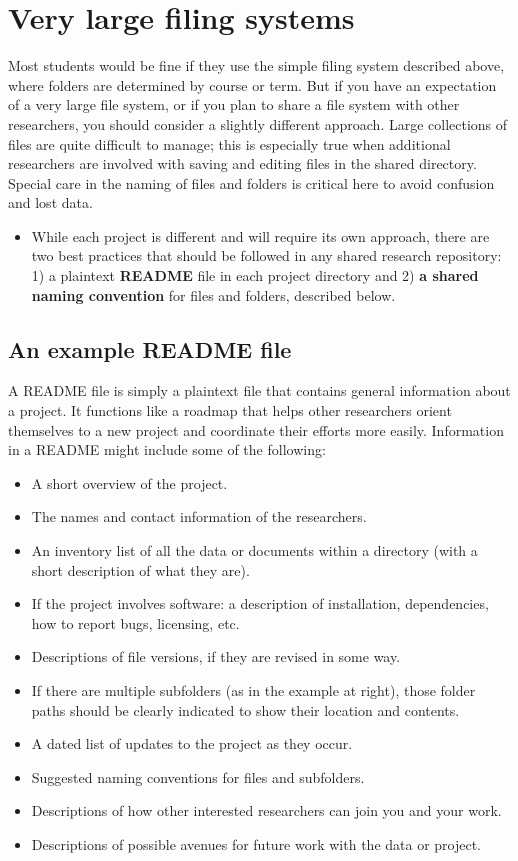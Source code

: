 \section{Very large filing systems}

Most students would be fine if they use the simple filing system described above, where folders are determined by course or term. But if you have an expectation of a very large file system, or if you plan to share a file system with other researchers, you should consider a slightly different approach. Large collections of files are quite difficult to manage; this is especially true when additional researchers are involved with saving and editing files in the shared directory. Special care in the naming of files and folders is critical here to avoid confusion and lost data. 

\begin{itemize}
\item While each project is different and will require its own approach, there are two best practices that should be followed in any shared research repository: 1) a plaintext \textbf{README} file in each project directory and 2) \textbf{a shared naming convention} for files and folders, described below.  
\end{itemize}

\subsection{An example README file}

A README file is simply a plaintext file that contains general information about a project. It functions like a roadmap that helps other researchers orient themselves to a new project and coordinate their efforts more easily.  Information in a README might include some of the following:

\begin{itemize}
\item A short overview of the project.
\item The names and contact information of the researchers.
\item An inventory list of all the data or documents within a directory (with a short description of what they are). 
\item If the project involves software: a description of installation, dependencies, how to report bugs, licensing, etc.
\item Descriptions of file versions, if they are revised in some way.
\item If there are multiple subfolders (as in the example at right), those folder paths should be clearly indicated to show their location and contents.
\item A dated list of updates to the project as they occur. 
\item Suggested naming conventions for files and subfolders.
\item Descriptions of how other interested researchers can join you and your work.
\item Descriptions of possible avenues for future work with the data or project.

\end{itemize}


